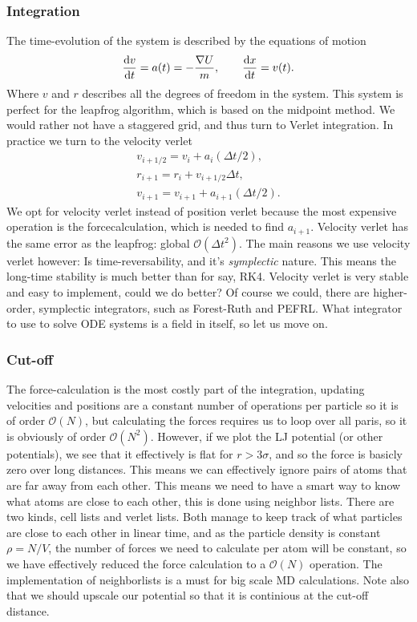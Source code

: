\documentclass[a4paper, 11pt, notitlepage, english]{article}
\renewcommand{\d}{{\rm d}}
\begin{document}
\subsubsection*{Integration}

The time-evolution of the system is described by the equations of motion
$$\frac{\d v}{\d t} = a(t) = -\frac{\nabla U}{m}, \qquad \frac{\d x}{\d t} = v(t).$$
Where $v$ and $r$ describes all the degrees of freedom in the system. This system is perfect for the leapfrog algorithm, which is based on the midpoint method. We would rather not have a staggered grid, and thus turn to Verlet integration. In practice we turn to the velocity verlet 
\begin{align*}
v_{i+1/2} = v_i + a_i (\Delta t /2), \\
r_{i+1} = r_i + v_{i+1/2} \Delta t, \\
v_{i+1} = v_{i+1} + a_{i+1} (\Delta t /2).
\end{align*}
We opt for velocity verlet instead of position verlet because the most expensive operation is the forcecalculation, which is needed to find $a_{i+1}$. Velocity verlet has the same error as the leapfrog: global $\mathcal{O}(\Delta t^2)$. The main reasons we use velocity verlet however: Is time-reversability, and it's \emph{symplectic} nature. This means the long-time stability is much better than for say, RK4. Velocity verlet is very stable and easy to implement, could we do better? Of course we could, there are higher-order, symplectic integrators, such as Forest-Ruth and PEFRL. What integrator to use to solve ODE systems is a field in itself, so let us move on.

\subsubsection*{Cut-off}
The force-calculation is the most costly part of the integration, updating velocities and positions are a constant number of operations per particle so it is of order $\mathcal{O}(N)$, but calculating the forces requires us to loop over all paris, so it is obviously of order $\mathcal{O}(N^2)$. However, if we plot the LJ potential (or other potentials), we see that it effectively is flat for $r > 3\sigma$, and so the force is basicly zero over long distances. This means we can effectively ignore pairs of atoms that are far away from each other. This means we need to have a smart way to know what atoms are close to each other, this is done using neighbor lists. There are two kinds, cell lists and verlet lists. Both manage to keep track of what particles are close to each other in linear time, and as the particle density is constant $\rho = N/V$, the number of forces we need to calculate per atom will be constant, so we have effectively reduced the force calculation to a $\mathcal{O}(N)$ operation. The implementation of neighborlists is a must for big scale MD calculations. Note also that we should upscale our potential so that it is continious at the cut-off distance.
\end{document}
